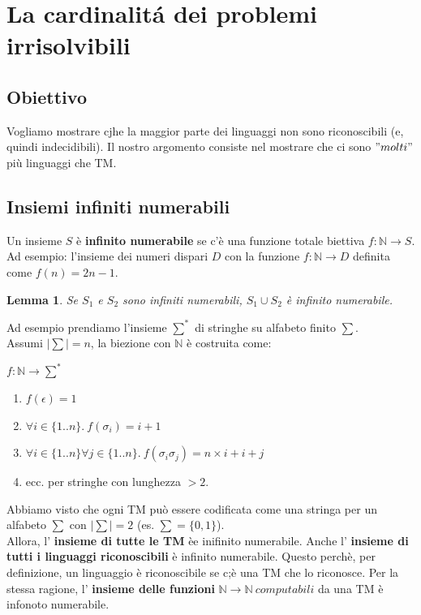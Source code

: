 \documentclass[a4paper, 12pt]{article}
\newtheorem{lemma}[theorem]{Lemma}
\begin{document}
\section{La cardinalit\'a dei problemi irrisolvibili}
\subsection{Obiettivo}
Vogliamo mostrare cjhe la maggior parte dei linguaggi non sono riconoscibili (e, quindi indecidibili). Il nostro argomento consiste nel mostrare che ci sono $"molti"$ pi\`u linguaggi che TM.
\subsection{Insiemi infiniti numerabili}
Un insieme $S$ \`e \textbf{infinito numerabile} se c'\`e una funzione totale biettiva $f: \mathbb{N} \rightarrow S$.
Ad esempio: l'insieme dei numeri dispari $D$ con la funzione $f: \mathbb{N} \rightarrow D$ definita come $f(n) = 2n - 1$.
\begin{lemma}
\label{lemma:1}
Se $S_1$ e $S_2$ sono infiniti numerabili, $S_{1} \cup S_{2}$ \`e infinito numerabile.
\end{lemma}
Ad esempio prendiamo l'insieme $\sum^{*}$ di stringhe su alfabeto finito $\sum$.\\Assumi $|\sum|=n$, la biezione con $\mathbb{N}$ \`e costruita come:
\begin{center}
$f: \mathbb{N} \rightarrow \sum^{*}$
\begin{enumerate}
\item $f(\epsilon) = 1$
\item $\forall i \in \{1..n\}.\ f(\sigma_{i}) = i + 1$
\item $\forall i \in \{1..n\} \forall j \in \{1..n\}.\ f(\sigma_{i} \sigma_{j})= n \times i + i+ j$
\item ecc. per stringhe con lunghezza $> 2$.
\end{enumerate}
\end{center}
Abbiamo visto che ogni TM pu\`o essere codificata come una stringa per un alfabeto $\sum$ con $|\sum| = 2$ (es. $\sum = \{0,1\}$).\\
Allora, l' \textbf{insieme di tutte le TM} \`ee inifinito numerabile. Anche l' \textbf{insieme di tutti i linguaggi riconoscibili} \`e infinito numerabile. Questo perch\`e, per definizione, un linguaggio \`e riconoscibile se c;\`e una TM che lo riconosce. Per la stessa ragione, l' \textbf{insieme delle funzioni} $\mathbb{N} \rightarrow \mathbb{N}\ computabili$ da una TM \`e infonoto numerabile. 
\end{document}
